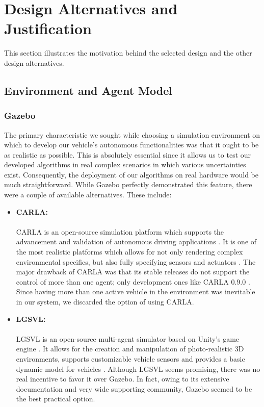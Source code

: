 
\section{Design Alternatives and Justification}
\label{des_alt_and_just}
This section illustrates the motivation behind the selected design and the other design alternatives.

\subsection{Environment and Agent Model}
\label{des_env_agent_mdl}

\subsubsection{Gazebo}

The primary characteristic we sought while choosing a simulation environment on which to develop our vehicle’s autonomous functionalities was that it ought to be as realistic as possible. This is absolutely essential since it allows us to test our developed algorithms in real complex scenarios in which various uncertainties exist. Consequently, the deployment of our algorithms on real hardware would be much straightforward. While Gazebo perfectly demonstrated this feature, there were a couple of available alternatives. These include:

\begin{itemize}
    \item \textbf{CARLA:} \\ \\
    CARLA is an open-source simulation platform which supports the advancement and validation of autonomous driving applications \cite{carla_software}. It is one of the most realistic platforms which allows for not only rendering complex environmental specifics, but also fully specifying sensors and actuators \cite{carla_software}. The major drawback of CARLA was that its stable releases do not support the control of more than one agent; only development ones like CARLA 0.9.0 \cite{Carla090}. Since having more than one active vehicle in the environment was inevitable in our system, we discarded the option of using CARLA.
    \item \textbf{LGSVL:} \\ \\
    LGSVL is an open-source multi-agent simulator based on Unity’s game engine \cite{LGSVL}. It allows for the creation and manipulation of photo-realistic 3D environments, supports customizable vehicle sensors and provides a basic dynamic model for vehicles \cite{LGSVL}. Although LGSVL seems promising, there was no real incentive to favor it over Gazebo. In fact, owing to its extensive documentation and very wide supporting community, Gazebo seemed to be the best practical option.
\end{itemize}

